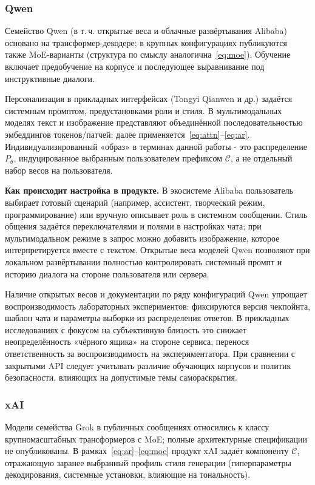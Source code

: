 \documentclass[areasetadvanced]{scrartcl}
\begin{document}
\subsubsection{Qwen}

Семейство Qwen (в т.\,ч. открытые веса и облачные развёртывания Alibaba) основано на трансформер-декодере; в крупных конфигурациях публикуются также MoE-варианты (структура по смыслу аналогична~\eqref{eq:moe}). Обучение включает предобучение на корпусе и последующее выравнивание под инструктивные диалоги.

Персонализация в прикладных интерфейсах (Tongyi Qianwen и др.) задаётся системным промптом, предустановками роли и стиля. В мультимодальных моделях текст и изображение представляют объединённой последовательностью эмбеддингов токенов/патчей; далее применяется~\eqref{eq:attn}--\eqref{eq:ar}. Индивидуализированный «образ» в терминах данной работы - это распределение $P_\theta$, индуцированное выбранным пользователем префиксом $\mathcal{C}$, а не отдельный набор весов на пользователя.

\textbf{Как происходит настройка в продукте.} В экосистеме Alibaba пользователь выбирает готовый сценарий (например, ассистент, творческий режим, программирование) или вручную описывает роль в системном сообщении. Стиль общения задаётся переключателями и полями в настройках чата; при мультимодальном режиме в запрос можно добавить изображение, которое интерпретируется вместе с текстом. Открытые веса моделей Qwen позволяют при локальном развёртывании полностью контролировать системный промпт и историю диалога на стороне пользователя или сервера.

Наличие открытых весов и документации по ряду конфигураций Qwen упрощает воспроизводимость лабораторных экспериментов: фиксируются версия чекпойнта, шаблон чата и параметры выборки из распределения ответов. В прикладных исследованиях с фокусом на субъективную близость это снижает неопределённость «чёрного ящика» на стороне сервиса, перенося ответственность за воспроизводимость на экспериментатора. При сравнении с закрытыми API следует учитывать различие обучающих корпусов и политик безопасности, влияющих на допустимые темы самораскрытия.

\subsubsection{xAI}

Модели семейства Grok в публичных сообщениях относились к классу крупномасштабных трансформеров с MoE; полные архитектурные спецификации не опубликованы. В рамках~\eqref{eq:ar}--\eqref{eq:moe} продукт xAI задаёт компоненту $\mathcal{C}$, отражающую заранее выбранный профиль стиля генерации (гиперпараметры декодирования, системные установки, влияющие на тональность).
\end{document}
